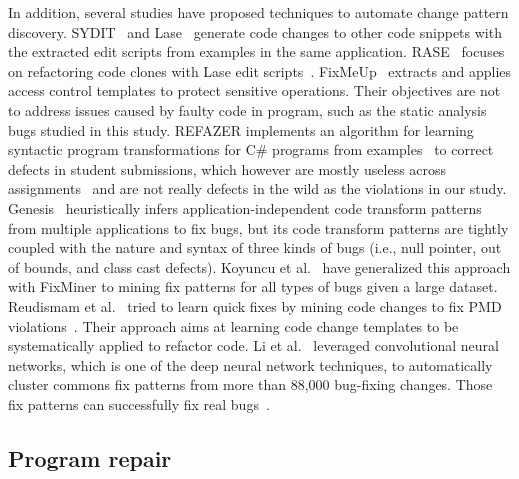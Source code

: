 In addition, several studies have proposed techniques to automate change pattern discovery.
SYDIT~\cite{meng2011systematic} and Lase~\cite{meng2013lase} generate code changes to other code snippets with the extracted edit scripts from examples in the same application. 
RASE~\cite{meng2015does} focuses on refactoring code clones with Lase edit scripts~\cite{meng2013lase}.  
FixMeUp~\cite{son2011rolecast} extracts and applies access control templates to protect sensitive operations. Their objectives are not to address issues caused by faulty code in program, such as the static analysis bugs studied in this study. 
REFAZER implements an algorithm for learning syntactic program transformations for C\# programs from examples~\cite{rolim2017learning} to correct defects in student submissions, which however are mostly useless across assignments~\cite{long2017automatic} and are not really defects in the wild as the violations in our study. Genesis~\cite{long2017automatic} heuristically infers application-independent code transform patterns from multiple applications to fix bugs, but its code transform patterns are tightly coupled with the nature and syntax of three kinds of bugs (i.e., null pointer, out of bounds, and class cast defects). 
Koyuncu et al.~\cite{koyuncu2018fixminer} have generalized this approach with FixMiner to mining fix patterns for all types of bugs given a large dataset. 
Reudismam et al.~\cite{rolim2018learning} tried to learn quick fixes by mining code changes to fix PMD violations~\cite{pmd}. Their approach aims at learning code change templates to be systematically applied to refactor code. 
Li et al.~\cite{liu_mining_2018} leveraged convolutional neural networks, which is one of the deep neural network techniques,
to automatically cluster commons fix patterns from more than 88,000 bug-fixing changes. Those fix patterns
can successfully fix real bugs~\cite{liu_avatar_2019}.


\subsection{Program repair}

